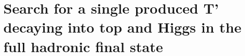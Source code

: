 \chapter[Single VLQ search]{Search for a single produced T' decaying into top and Higgs in the full hadronic final state}